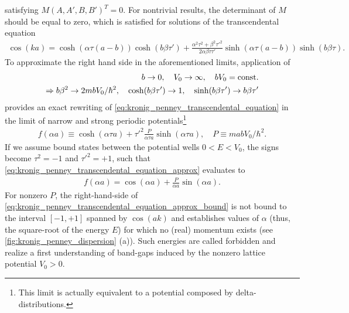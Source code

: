satisfying $M(A,A',B,B')^T=0$.
For nontrivial results, the determinant of $M$ should be equal to zero, which is satisfied for solutions of the transcendental equation
\begin{align}
    \cos(ka)
    =
    \cosh(\alpha\tau(a-b))\cosh(b\beta\tau')
    +
    \frac{\alpha^2\tau^2+\beta^2\tau'^2}{2\alpha\beta\tau\tau'}\sinh(\alpha\tau(a-b))\sinh(b\beta\tau).
    \label{eq:kronig_penney_transcendental_equation}
\end{align}
To approximate the right hand side in the aforementioned limits, application of
\begin{align}
    b\rightarrow0,
    \quad
    V_0\rightarrow\infty,
    \quad
    bV_0 = {\rm const.}
    \\
    \Rightarrow
    b\beta^2\rightarrow 2mbV_0/\hbar^2,
    \quad
    \cosh(b\beta\tau')\rightarrow 1,
    \quad
    \sinh(b\beta\tau')\rightarrow b\beta\tau'
\end{align}
provides an exact rewriting of \cref{eq:kronig_penney_transcendental_equation} in the limit of narrow and strong periodic potentials\footnote{This limit is actually equivalent to a potential composed by delta-distributions.}
\begin{align}
    f(\alpha a) \equiv \cosh(\alpha\tau a) + \tau'^2\frac{P}{\alpha\tau a}\sinh(\alpha\tau a),
    \quad
    P \equiv mabV_0/\hbar^2.
    \label{eq:kronig_penney_transcendental_equation_approx}
\end{align}
If we assume bound states between the potential wells $0<E<V_0$, the signs become $\tau^2=-1$ and $\tau'^2=+1$, such that \cref{eq:kronig_penney_transcendental_equation_approx} evaluates to
\begin{align}
    f(\alpha a) = \cos(\alpha a) + \frac{P}{\alpha a}\sin(\alpha a).
    \label{eq:kronig_penney_transcendental_equation_approx_bound}
\end{align}
For nonzero $P$, the right-hand-side of \cref{eq:kronig_penney_transcendental_equation_approx_bound} is not bound to the interval $[-1,+1]$ spanned by $\cos(ak)$ and establishes values of $\alpha$ (thus, the square-root of the energy $E$) for which no (real) momentum exists (see \cref{fig:kronig_penney_dispersion} (a)).
Such energies are called forbidden and realize a first understanding of band-gaps induced by the nonzero lattice potential $V_0>0$.
